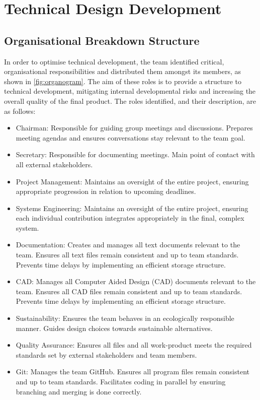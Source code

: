 \chapter{Technical Design Development}

\section{Organisational Breakdown Structure}
In order to optimise technical development, the team identified critical, organisational responsibilities and distributed them amongst its members, as shown in \autoref{fig:organogram}. The aim of these roles is to provide a structure to technical development, mitigating internal developmental risks and increasing the overall quality of the final product. The roles identified, and their description, are as follows:

\begin{itemize}
    \item Chairman: Responsible for guiding group meetings and discussions. Prepares meeting agendas and ensures conversations stay relevant to the team goal.
    \item Secretary: Responsible for documenting meetings. Main point of contact with all external stakeholders.
    \item Project Management: Maintains an oversight of the entire project, ensuring appropriate progression in relation to upcoming deadlines.
    \item Systems Engineering: Maintains an oversight of the entire project, ensuring each individual contribution integrates appropriately in the final, complex system.
    \item Documentation: Creates and manages all text documents relevant to the team. Ensures all text files remain consistent and up to team standards. Prevents time delays by implementing an efficient storage structure.
    \item CAD: Manages all Computer Aided Design (CAD) documents relevant to the team. Ensures all CAD files remain consistent and up to team standards. Prevents time delays by implementing an efficient storage structure.
    \item Sustainability: Ensures the team behaves in an ecologically responsible manner. Guides design choices towards sustainable alternatives.
    \item Quality Assurance: Ensures all files and all work-product meets the required standards set by external stakeholders and team members.
    \item Git: Manages the team GitHub. Ensures all program files remain consistent and up to team standards. Facilitates coding in parallel by ensuring branching and merging is done correctly.
\end{itemize}

